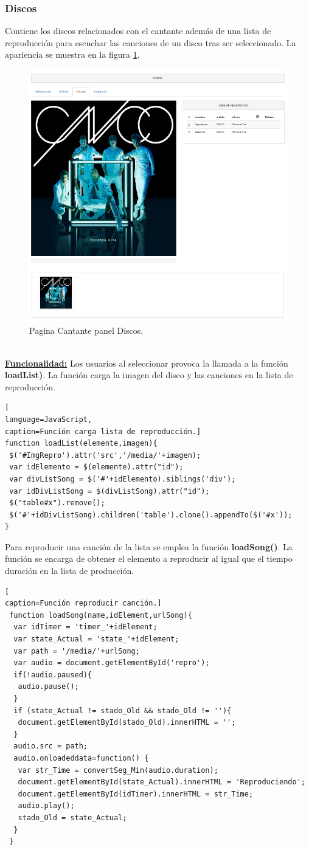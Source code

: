 \subsubsection*{Discos}
Contiene los discos relacionados con el cantante además de una lista de reproducción para escuchar las canciones de un disco tras ser seleccionado. La apariencia se muestra en la figura \ref{fig:Discos_Cantante}.
\begin{figure}[!h]
\begin{center}
   \includegraphics[width=0.4\linewidth]{Figures/discos_Cantante}
  \decoRule
  \caption[Cantante panel Discos]{Pagina Cantante panel Discos.}
\label{fig:Discos_Cantante}
\end{center}
\end{figure}
\\\underline{\textbf{Funcionalidad:}} Los usuarios al seleccionar provoca la llamada a la función \textbf{loadList)}. La función carga la imagen del disco y las canciones en la lista de reproducción.
\begin{lstlisting}[
language=JavaScript,
caption=Función carga lista de reproducción.]
function loadList(elemente,imagen){
 $('#ImgRepro').attr('src','/media/'+imagen);
 var idElemento = $(elemente).attr("id");
 var divListSong = $('#'+idElemento).siblings('div');
 var idDivListSong = $(divListSong).attr("id");
 $("table#x").remove();
 $('#'+idDivListSong).children('table').clone().appendTo($('#x'));
}
\end{lstlisting}
Para reproducir una canción de la lista se emplea la función \textbf{loadSong()}. La función se encarga de obtener el elemento a reproducir al igual que el tiempo duración en la lista de producción.
\begin{lstlisting}[
caption=Función reproducir canción.]
 function loadSong(name,idElement,urlSong){
  var idTimer = 'timer_'+idElement;
  var state_Actual = 'state_'+idElement;
  var path = '/media/'+urlSong;
  var audio = document.getElementById('repro');
  if(!audio.paused){
   audio.pause();
  }
  if (state_Actual != stado_Old && stado_Old != ''){
   document.getElementById(stado_Old).innerHTML = '';
  }
  audio.src = path; 
  audio.onloadeddata=function() {
   var str_Time = convertSeg_Min(audio.duration);
   document.getElementById(state_Actual).innerHTML = 'Reproduciendo';
   document.getElementById(idTimer).innerHTML = str_Time;
   audio.play();
   stado_Old = state_Actual;
  }
 }
\end{lstlisting}
